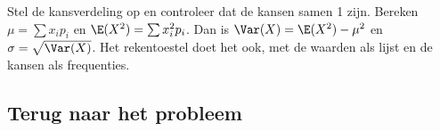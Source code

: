 \begin{werkwijze}
Stel de kansverdeling op en controleer dat de kansen samen 1 zijn. Bereken $\mu = \sum x_i p_i$ en $\E(X^2) = \sum x_i^2 p_i$. Dan is $\Var(X) = \E(X^2) - \mu^2$ en $\sigma = \sqrt{\Var(X)}$. Het rekentoestel doet het ook, met de waarden als lijst en de kansen als frequenties.
\end{werkwijze}


\begin{oefeningen}

\end{oefeningen}

\subsection{Terug naar het probleem}

